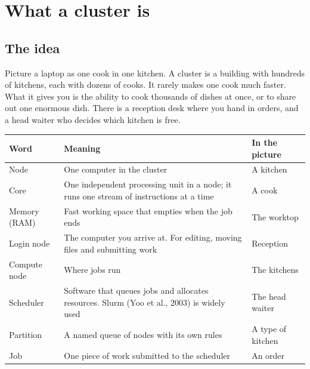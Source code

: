 \chapter{What a cluster is}
\label{ch:concepts}

\section{The idea}\label{the-idea}

Picture a laptop as one cook in one kitchen. A cluster is a building with hundreds of kitchens, each with dozens of cooks. It rarely makes one cook much faster. What it gives you is the ability to cook thousands of dishes at once, or to share out one enormous dish. There is a reception desk where you hand in orders, and a head waiter who decides which kitchen is free.

{\def\LTcaptype{none} %
\begin{longtable}[]{@{}
  >{\raggedright\arraybackslash}p{}
  >{\raggedright\arraybackslash}p{}
  >{\raggedright\arraybackslash}p{}@{}}
\toprule\noalign{}
\begin{minipage}[b]{\linewidth}\raggedright
Word
\end{minipage} & \begin{minipage}[b]{\linewidth}\raggedright
Meaning
\end{minipage} & \begin{minipage}[b]{\linewidth}\raggedright
In the picture
\end{minipage} \\
\midrule\noalign{}
\endhead
\bottomrule\noalign{}
\endlastfoot
Node & One computer in the cluster & A kitchen \\
Core & One independent processing unit in a node; it runs one stream of instructions at a time & A cook \\
Memory (RAM) & Fast working space that empties when the job ends & The worktop \\
Login node & The computer you arrive at. For editing, moving files and submitting work & Reception \\
Compute node & Where jobs run & The kitchens \\
Scheduler & Software that queues jobs and allocates resources. Slurm (Yoo et al., 2003) is widely used & The head waiter \\
Partition & A named queue of nodes with its own rules & A type of kitchen \\
Job & One piece of work submitted to the scheduler & An order \\
\end{longtable}
}


